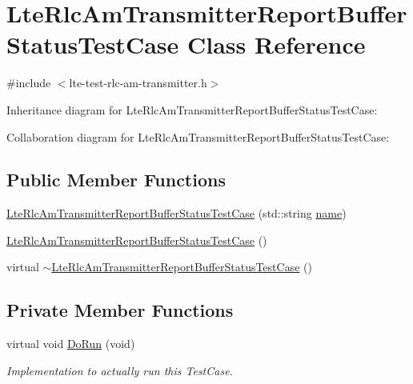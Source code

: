 \hypertarget{classLteRlcAmTransmitterReportBufferStatusTestCase}{}\section{Lte\+Rlc\+Am\+Transmitter\+Report\+Buffer\+Status\+Test\+Case Class Reference}
\label{classLteRlcAmTransmitterReportBufferStatusTestCase}


{\ttfamily \#include $<$lte-\/test-\/rlc-\/am-\/transmitter.\+h$>$}



Inheritance diagram for Lte\+Rlc\+Am\+Transmitter\+Report\+Buffer\+Status\+Test\+Case\+:


Collaboration diagram for Lte\+Rlc\+Am\+Transmitter\+Report\+Buffer\+Status\+Test\+Case\+:
\subsection*{Public Member Functions}
\begin{DoxyCompactItemize}
\item 
\hyperlink{classLteRlcAmTransmitterReportBufferStatusTestCase_a5d89f01d136de5403a8472bd972b8171}{Lte\+Rlc\+Am\+Transmitter\+Report\+Buffer\+Status\+Test\+Case} (std\+::string \hyperlink{generate__test__data__lte__spectrum__model_8m_ab74e6bf80237ddc4109968cedc58c151}{name})
\item 
\hyperlink{classLteRlcAmTransmitterReportBufferStatusTestCase_a1284eed6e3ea8ec495db3e944a88320c}{Lte\+Rlc\+Am\+Transmitter\+Report\+Buffer\+Status\+Test\+Case} ()
\item 
virtual \hyperlink{classLteRlcAmTransmitterReportBufferStatusTestCase_a941beaecc2466e5954234719126955a8}{$\sim$\+Lte\+Rlc\+Am\+Transmitter\+Report\+Buffer\+Status\+Test\+Case} ()
\end{DoxyCompactItemize}
\subsection*{Private Member Functions}
\begin{DoxyCompactItemize}
\item 
virtual void \hyperlink{classLteRlcAmTransmitterReportBufferStatusTestCase_aaddc27c1dd83c3856296c778210c5df2}{Do\+Run} (void)
\begin{DoxyCompactList}\small\item\em Implementation to actually run this Test\+Case. \end{DoxyCompactList}\end{DoxyCompactItemize}

